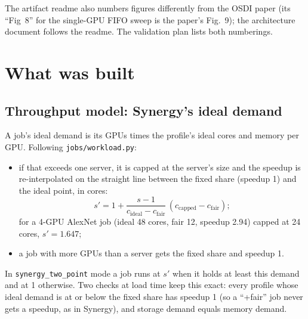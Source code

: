 \documentclass[11pt,a4paper]{article}
\newcommand{\code}[1]{\texttt{#1}}
\begin{document}
The artifact readme also numbers figures differently from the OSDI paper (its ``Fig~8'' for the
single-GPU FIFO sweep is the paper's Fig.~9); the architecture document follows the readme. The
validation plan lists both numberings.

\section{What was built}

\subsection{Throughput model: Synergy's ideal demand}
A job's ideal demand is its GPUs times the profile's ideal cores and memory per GPU. Following
\code{jobs/workload.py}:
\begin{itemize}
  \item if that exceeds one server, it is capped at the server's size and the speedup is
        re-interpolated on the straight line between the fixed share (speedup 1) and the ideal point,
        in cores:
        \[ s' = 1 + \frac{s - 1}{c_\text{ideal} - c_\text{fair}}\,(c_\text{capped} - c_\text{fair}); \]
        for a 4-GPU AlexNet job (ideal 48 cores, fair 12, speedup 2.94) capped at 24 cores, \(s' = 1.647\);
  \item a job with more GPUs than a server gets the fixed share and speedup 1.
\end{itemize}
In \code{synergy\_two\_point} mode a job runs at \(s'\) when it holds at least this demand and at 1
otherwise. Two checks at load time keep this exact: every profile whose ideal demand is at or below the
fixed share has speedup 1 (so a ``+fair'' job never gets a speedup, as in Synergy), and storage demand
equals memory demand.
\end{document}
